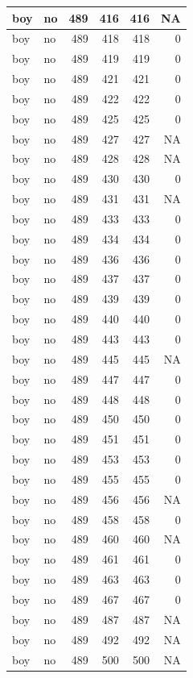 \documentclass[man]{apa6}
\begin{document}
\begin{tabular}{l|l|r|r|r|r}
\hline
boy & no & 489 & 416 & 416 & NA\\
\hline
boy & no & 489 & 418 & 418 & 0\\
\hline
boy & no & 489 & 419 & 419 & 0\\
\hline
boy & no & 489 & 421 & 421 & 0\\
\hline
boy & no & 489 & 422 & 422 & 0\\
\hline
boy & no & 489 & 425 & 425 & 0\\
\hline
boy & no & 489 & 427 & 427 & NA\\
\hline
boy & no & 489 & 428 & 428 & NA\\
\hline
boy & no & 489 & 430 & 430 & 0\\
\hline
boy & no & 489 & 431 & 431 & NA\\
\hline
boy & no & 489 & 433 & 433 & 0\\
\hline
boy & no & 489 & 434 & 434 & 0\\
\hline
boy & no & 489 & 436 & 436 & 0\\
\hline
boy & no & 489 & 437 & 437 & 0\\
\hline
boy & no & 489 & 439 & 439 & 0\\
\hline
boy & no & 489 & 440 & 440 & 0\\
\hline
boy & no & 489 & 443 & 443 & 0\\
\hline
boy & no & 489 & 445 & 445 & NA\\
\hline
boy & no & 489 & 447 & 447 & 0\\
\hline
boy & no & 489 & 448 & 448 & 0\\
\hline
boy & no & 489 & 450 & 450 & 0\\
\hline
boy & no & 489 & 451 & 451 & 0\\
\hline
boy & no & 489 & 453 & 453 & 0\\
\hline
boy & no & 489 & 455 & 455 & 0\\
\hline
boy & no & 489 & 456 & 456 & NA\\
\hline
boy & no & 489 & 458 & 458 & 0\\
\hline
boy & no & 489 & 460 & 460 & NA\\
\hline
boy & no & 489 & 461 & 461 & 0\\
\hline
boy & no & 489 & 463 & 463 & 0\\
\hline
boy & no & 489 & 467 & 467 & 0\\
\hline
boy & no & 489 & 487 & 487 & NA\\
\hline
boy & no & 489 & 492 & 492 & NA\\
\hline
boy & no & 489 & 500 & 500 & NA\\

\end{tabular}
\end{document}

